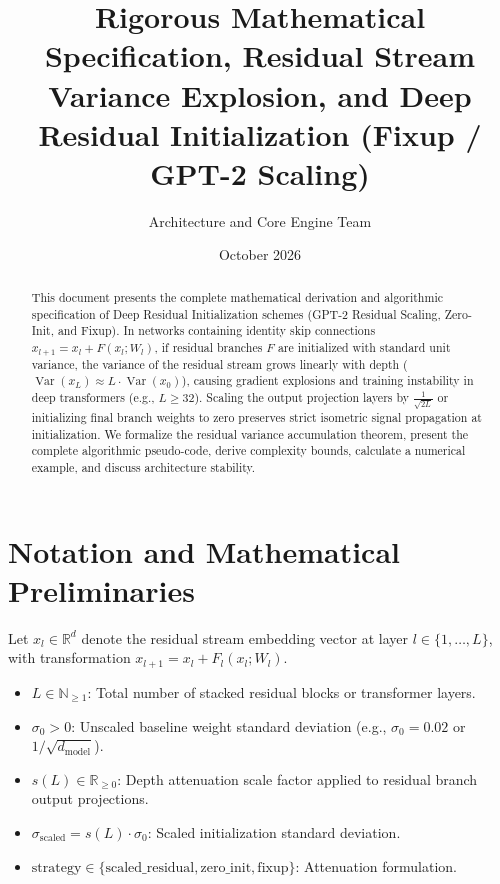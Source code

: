\documentclass[11pt,a4paper]{article}
\title{\textbf{Rigorous Mathematical Specification, Residual Stream Variance Explosion, and Deep Residual Initialization (Fixup / GPT-2 Scaling)}}
\author{Architecture and Core Engine Team}
\date{October 2026}
\theoremstyle{definition}
\begin{document}
\maketitle

\begin{abstract}
This document presents the complete mathematical derivation and algorithmic specification of Deep Residual Initialization schemes (GPT-2 Residual Scaling, Zero-Init, and Fixup). In networks containing identity skip connections $x_{l+1} = x_l + F(x_l; W_l)$, if residual branches $F$ are initialized with standard unit variance, the variance of the residual stream grows linearly with depth ($\operatorname{Var}(x_L) \approx L \cdot \operatorname{Var}(x_0)$), causing gradient explosions and training instability in deep transformers (e.g., $L \ge 32$). Scaling the output projection layers by $\frac{1}{\sqrt{2L}}$ or initializing final branch weights to zero preserves strict isometric signal propagation at initialization. We formalize the residual variance accumulation theorem, present the complete algorithmic pseudo-code, derive complexity bounds, calculate a numerical example, and discuss architecture stability.
\end{abstract}

\section{Notation and Mathematical Preliminaries}

Let $x_l \in \mathbb{R}^d$ denote the residual stream embedding vector at layer $l \in \{1, \dots, L\}$, with transformation $x_{l+1} = x_l + F_l(x_l; W_l)$.

\begin{itemize}
    \item $L \in \mathbb{N}_{\ge 1}$: Total number of stacked residual blocks or transformer layers.
    \item $\sigma_0 > 0$: Unscaled baseline weight standard deviation (e.g., $\sigma_0 = 0.02$ or $1 / \sqrt{d_{\text{model}}}$).
    \item $s(L) \in \mathbb{R}_{\ge 0}$: Depth attenuation scale factor applied to residual branch output projections.
    \item $\sigma_{\text{scaled}} = s(L) \cdot \sigma_0$: Scaled initialization standard deviation.
    \item $\text{strategy} \in \{\text{scaled\_residual}, \text{zero\_init}, \text{fixup}\}$: Attenuation formulation.
\end{itemize}
\end{document}
